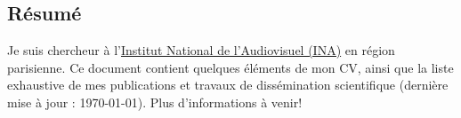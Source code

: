 \begin{fr}
\section*{Résumé}

Je suis chercheur à l'\href{https://www.ina.fr}{Institut National de l'Audiovisuel (INA)} en région parisienne.
Ce document contient quelques éléments de mon CV, ainsi que la liste exhaustive de mes publications et travaux de dissémination scientifique (dernière mise à jour : \today).
Plus d'informations à venir!
\end{fr}



\tableofcontents




